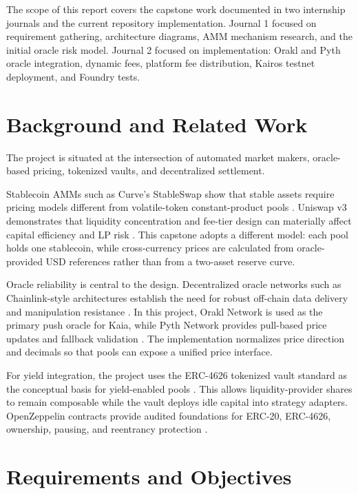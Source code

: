 \documentclass{article}
\begin{document}
The scope of this report covers the capstone work documented in two internship journals and the current repository implementation. Journal 1 focused on requirement gathering, architecture diagrams, AMM mechanism research, and the initial oracle risk model. Journal 2 focused on implementation: Orakl and Pyth oracle integration, dynamic fees, platform fee distribution, Kairos testnet deployment, and Foundry tests.

\section{Background and Related Work}

The project is situated at the intersection of automated market makers, oracle-based pricing, tokenized vaults, and decentralized settlement.

Stablecoin AMMs such as Curve's StableSwap show that stable assets require pricing models different from volatile-token constant-product pools \cite{curve-stableswap}. Uniswap v3 demonstrates that liquidity concentration and fee-tier design can materially affect capital efficiency and LP risk \cite{uniswap-v3}. This capstone adopts a different model: each pool holds one stablecoin, while cross-currency prices are calculated from oracle-provided USD references rather than from a two-asset reserve curve.

Oracle reliability is central to the design. Decentralized oracle networks such as Chainlink-style architectures establish the need for robust off-chain data delivery and manipulation resistance \cite{chainlink-whitepaper}. In this project, Orakl Network is used as the primary push oracle for Kaia, while Pyth Network provides pull-based price updates and fallback validation \cite{orakl-docs,pyth-docs}. The implementation normalizes price direction and decimals so that pools can expose a unified price interface.

For yield integration, the project uses the ERC-4626 tokenized vault standard as the conceptual basis for yield-enabled pools \cite{eip4626}. This allows liquidity-provider shares to remain composable while the vault deploys idle capital into strategy adapters. OpenZeppelin contracts provide audited foundations for ERC-20, ERC-4626, ownership, pausing, and reentrancy protection \cite{openzeppelin-contracts}.

\section{Requirements and Objectives}
\end{document}
